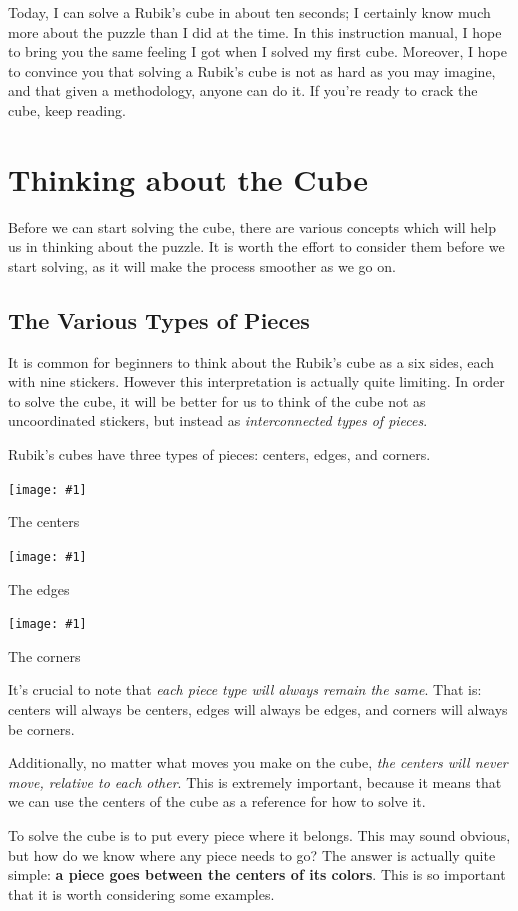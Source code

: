 \documentclass[12pt,letterpaper]{article}
\newcommand{\pictxt}[2]{
  \begin{center}
	  \texttt{[image: \#1]}

    {\sc #2}
  \end{center}
}
\begin{document}
Today, I can solve a Rubik's cube in about ten seconds; I certainly know much
more about the puzzle than I did at the time. In this instruction manual, I hope
to bring you the same feeling I got when I solved my first cube. Moreover, I
hope to convince you that solving a Rubik's cube is not as hard as you may
imagine, and that given a methodology, anyone can do it. If you're ready to
crack the cube, keep reading.

\newpage


\section{Thinking about the Cube}

Before we can start solving the cube, there are various concepts which will help
us in thinking about the puzzle. It is worth the effort to consider them before
we start solving, as it will make the process smoother as we go on.

\subsection{The Various Types of Pieces}

It is common for beginners to think about the Rubik's cube as a six sides, each
with nine stickers. However this interpretation is actually quite limiting. In
order to solve the cube, it will be better for us to think of the cube not as
uncoordinated stickers, but instead as \textit{interconnected types of pieces}.

Rubik's cubes have three types of pieces: {\sc centers}, {\sc edges}, and
{\sc corners}.

\begin{multicols}{3}
    \pictxt{centers}{The centers}

    \pictxt{edges}{The edges}

    \pictxt{corners}{The corners}
\end{multicols}

It's crucial to note that {\it each piece type will always remain the same}.
That is: centers will always be centers, edges will always be edges, and corners
will always be corners.

Additionally, no matter what moves you make on the cube, {\it the centers will
never move, relative to each other}. This is extremely important, because it
means that we can use the centers of the cube as a reference for how to solve
it.

To solve the cube is to put every piece where it belongs. This may sound
obvious, but how do we know where any piece needs to go? The answer is actually
quite simple: {\bf a piece goes between the centers of its colors}. This is so
important that it is worth considering some examples.
\end{document}
